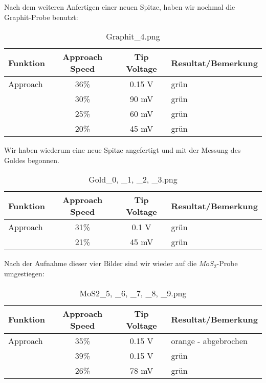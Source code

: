 
Nach dem weiteren Anfertigen einer neuen Spitze, haben wir nochmal die Graphit-Probe benutzt:

\begin{table}[H]
\caption{Graphit\_4.png}
\centering \begin{tabular}[H]{l c c l}
Funktion & Approach Speed & Tip Voltage & Resultat/Bemerkung\\ \hline
Approach & 36\% & 0.15 V & grün\\
 & 30\% & 90 mV & grün\\
 & 25\% & 60 mV & grün\\
 & 20\% & 45 mV & grün
\end{tabular}
\end{table}


Wir haben wiederum eine neue Spitze angefertigt und mit der Messung des Goldes begonnen. 

\begin{table}[H]
\caption{Gold\_0, \_1, \_2, \_3.png}
\centering \begin{tabular}[H]{l c c l}
Funktion & Approach Speed & Tip Voltage & Resultat/Bemerkung\\ \hline
Approach & 31\% & 0.1 V & grün\\
 & 21\% & 45 mV & grün\\
\end{tabular}
\end{table}





Nach der Aufnahme dieser vier Bilder sind wir wieder auf die $MoS_2$-Probe umgestiegen:

\begin{table}[H]
\caption{MoS2\_5, \_6, \_7, \_8, \_9.png}
\centering \begin{tabular}[H]{l c c l}
Funktion & Approach Speed & Tip Voltage & Resultat/Bemerkung\\ \hline
Approach & 35\% & 0.15 V & orange - abgebrochen\\
 & 39\% & 0.15 V & grün\\
 & 26\% & 78 mV & grün
\end{tabular}
\end{table}


